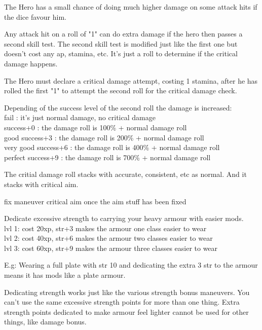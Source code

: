  The Hero has a small chance of doing much higher damage on some attack hits if the dice favour him.

Any attack hit on a roll of "1" can do extra damage if the hero then passes a second skill test. The second skill test is modified just like the first one but doesn't cost any ap, stamina, etc. It's just a roll to determine if the critical damage happens.

The Hero must declare a critical damage attempt, costing 1 stamina, after he has rolled the first "1" to attempt the second roll for the critical damage check.

Depending of the success level of the second roll the damage is increased:\\
fail : it's just normal damage, no critical damage \\
success+0 : the damage roll is 100\% + normal damage roll \\
good success+3 : the damage roll is 200\% + normal damage roll \\
very good success+6 : the damage roll is 400\% + normal damage roll \\
perfect success+9 : the damage roll is 700\% + normal damage roll

The critial damage roll stacks with accurate, consistent, etc as normal. And it stacks with critical aim.


\TODO fix maneuver critical aim once the aim stuff has been fixed


Dedicate excessive strength to carrying your heavy armour with easier mods.\\
lvl 1: cost 20xp, str+3 makes the armour one class easier to wear\\
lvl 2: cost 40xp, str+6 makes the armour two classes easier to wear\\
lvl 3: cost 60xp, str+9 makes the armour three classes easier to wear

E.g: Wearing a full plate with str 10 and dedicating the extra 3 str to the armour means it has mods like a plate armour.

Dedicating strength works just like the various strength bonus maneuvers. You can't use the same excessive strength points for more than one thing. Extra strength points dedicated to make armour feel lighter cannot be used for other things, like damage bonus.

